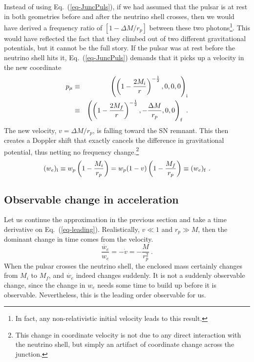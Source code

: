 \documentclass[aps,showpacs,twocolumn,floats,prd,superscriptaddress,nofootinbib]{revtex4-1}
\begin{document}
Instead of using Eq.~(\ref{eq-JuncPuls}), if we had assumed that the pulsar is at rest in both geometries before and after the neutrino shell crosses, then we would have derived a frequency ratio of $[1-\Delta M/r_p]$ between these two photons\footnote{In fact, any non-relativistic initial velocity leads to this result.}. This would have reflected the fact that they climbed out of two different gravitational potentials, but it cannot be the full story. If the pulsar was at rest before the neutrino shell hits it, Eq.~(\ref{eq-JuncPuls}) demands that it picks up a velocity in the new coordinate
 \begin{eqnarray}
p_\mu &\equiv& \left( \left( 1 - \frac{2M_i}{r} \right)^{-\frac{1}{2}}, 0, 0,0\right)_{\rm i} 
\label{eq-PulsarRest} \\ \nonumber  &\equiv&	
\left( \left( 1 - \frac{2M_f}{r} \right)^{-\frac{1}{2}}, -\frac{\Delta M}{r_p},0,0 \right)_{\rm f}~.
\end{eqnarray}
The new velocity, $v=\Delta M/r_p$, is falling toward the SN remnant. This then creates a Doppler shift that exactly cancels the difference in gravitational potential, thus netting no frequency change.\footnote{This change in coordinate velocity is not due to any direct interaction with the neutrino shell, but simply an artifact of coordinate change across the junction.}
\begin{equation}
(w_e)_{\rm i} \equiv w_p \left(1-\frac{M_i}{r_p}\right) = 
w_p (1-v)\left(1-\frac{M_f}{r_p}\right) \equiv (w_e)_{\rm f}~.
\label{eq-leading}
\end{equation}

\subsection{Observable change in acceleration}
\label{sec-acceleration}

Let us continue the approximation in the previous section and take a time derivative on Eq.~(\ref{eq-leading}). Realistically, $v \ll1$ and $r_p\gg M$, then the dominant change in time comes from the velocity.
\begin{equation}
\frac{\dot{w_e}}{w_e} = -\dot{v} = -\frac{M}{r_p^2}~.
\label{eq-AccChange}
\end{equation}
When the pulsar crosses the neutrino shell, the enclosed mass certainly changes from $M_i$ to $M_f$, and $\dot{w_e}$ indeed changes suddenly. It is not a suddenly observable change, since the change in $w_e$ needs some time to build up before it is observable. Nevertheless, this is the leading order observable for us.
\end{document}

